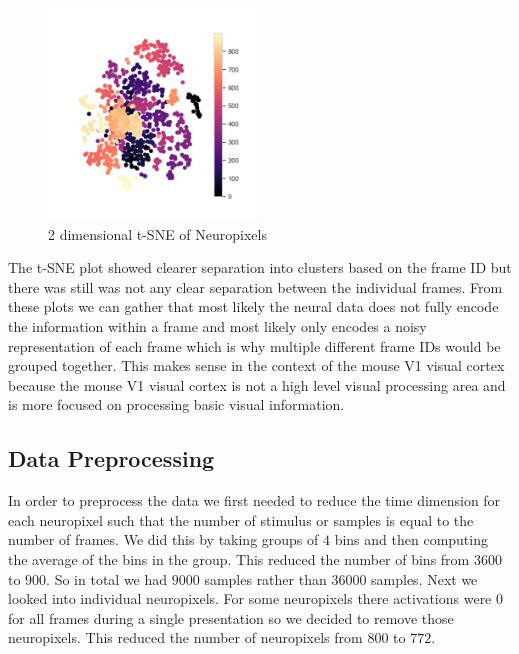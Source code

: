 \documentclass[12pt, letterpaper]{article}
\begin{document}
\begin{figure}[H]
    \centering
    \includegraphics[width=0.5\textwidth]{tsne_neuropixels.png}
    \caption{2 dimensional t-SNE of Neuropixels}
    \label{fig:2d_tsne_neuropixels}
\end{figure}

The t-SNE plot showed clearer separation into clusters based on the frame ID but there was still was not any clear separation between the individual frames. From these plots we can gather that most likely the neural data does not fully encode the information within a frame and most likely only encodes a noisy representation of each frame which is why multiple different frame IDs would be grouped together. This makes sense in the context of the mouse V1 visual cortex because the mouse V1 visual cortex is not a high level visual processing area and is more focused on processing basic visual information.

\subsection{Data Preprocessing}
\label{subsec:data_preprocessing}
In order to preprocess the data we first needed to reduce the time dimension for each neuropixel such that the number of stimulus or samples is equal to the number of frames. We did this by taking groups of $4$ bins and then computing the average of the bins in the group. This reduced the number of bins from $3600$ to $900$. So in total we had $9000$ samples rather than $36000$ samples. Next we looked into individual neuropixels. For some neuropixels there activations were $0$ for all frames during a single presentation so we decided to remove those neuropixels. This reduced the number of neuropixels from $800$ to $772$. 
\end{document}
